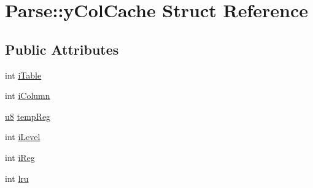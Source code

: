 \hypertarget{struct_parse_1_1y_col_cache}{\section{Parse\-:\-:y\-Col\-Cache Struct Reference}
\label{struct_parse_1_1y_col_cache}
}
\subsection*{Public Attributes}
\begin{DoxyCompactItemize}
\item 
int \hyperlink{struct_parse_1_1y_col_cache_a7d99a4e00555cb0ff7fb3990bb7b549e}{i\-Table}
\item 
int \hyperlink{struct_parse_1_1y_col_cache_a67bdb189ef88aca5fc30b551da9a0f90}{i\-Column}
\item 
\hyperlink{sqlite3_8c_a74a0f6424ae628af25f23f0a35f6ead3}{u8} \hyperlink{struct_parse_1_1y_col_cache_a61561cab1ce2e1914083777ae84c8fe8}{temp\-Reg}
\item 
int \hyperlink{struct_parse_1_1y_col_cache_a656ea77cf538db00249221de58fd9066}{i\-Level}
\item 
int \hyperlink{struct_parse_1_1y_col_cache_aadb47e545234142bd1e9ca4803953ab0}{i\-Reg}
\item 
int \hyperlink{struct_parse_1_1y_col_cache_ac163bb2b692f3037054f92294322f999}{lru}
\end{DoxyCompactItemize}


